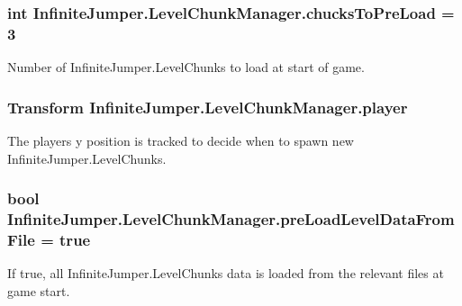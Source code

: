 \subsubsection[{chucks\+To\+Pre\+Load}]{\setlength{\rightskip}{0pt plus 5cm}int Infinite\+Jumper.\+Level\+Chunk\+Manager.\+chucks\+To\+Pre\+Load = 3}\label{class_infinite_jumper_1_1_level_chunk_manager_a8bd3df227bc8c78ee532528f16587461}


Number of Infinite\+Jumper.\+Level\+Chunks to load at start of game. 

\hypertarget{class_infinite_jumper_1_1_level_chunk_manager_a22cad8b920dcb4f6089c5c831186e8d2}{}
\subsubsection[{player}]{\setlength{\rightskip}{0pt plus 5cm}Transform Infinite\+Jumper.\+Level\+Chunk\+Manager.\+player}\label{class_infinite_jumper_1_1_level_chunk_manager_a22cad8b920dcb4f6089c5c831186e8d2}


The players y position is tracked to decide when to spawn new Infinite\+Jumper.\+Level\+Chunks. 

\hypertarget{class_infinite_jumper_1_1_level_chunk_manager_ac1b5eb925b24bb196a194e09723b6f09}{}
\subsubsection[{pre\+Load\+Level\+Data\+From\+File}]{\setlength{\rightskip}{0pt plus 5cm}bool Infinite\+Jumper.\+Level\+Chunk\+Manager.\+pre\+Load\+Level\+Data\+From\+File = true}\label{class_infinite_jumper_1_1_level_chunk_manager_ac1b5eb925b24bb196a194e09723b6f09}


If true, all Infinite\+Jumper.\+Level\+Chunks data is loaded from the relevant files at game start. 

\hypertarget{class_infinite_jumper_1_1_level_chunk_manager_a0665ca9547c77c3818c123194d3f6016}{}
